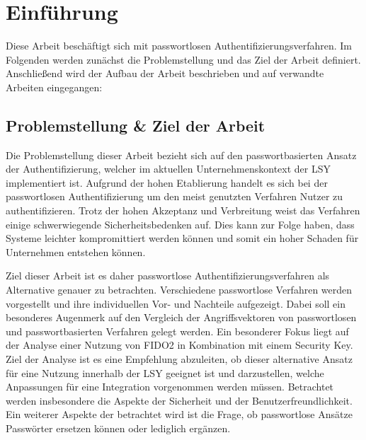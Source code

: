 \chapter{Einführung}
Diese Arbeit beschäftigt sich mit passwortlosen Authentifizierungsverfahren. Im Folgenden werden zunächst die Problemstellung und das Ziel der Arbeit definiert. Anschließend wird der Aufbau der Arbeit beschrieben und auf verwandte Arbeiten eingegangen:

\section{Problemstellung \& Ziel der Arbeit} \label{target}
Die Problemstellung dieser Arbeit bezieht sich auf den passwortbasierten Ansatz der Authentifizierung, welcher im aktuellen Unternehmenskontext der \ac{LSY} implementiert ist. Aufgrund der hohen Etablierung handelt es sich bei der passwortlosen Authentifizierung um den meist genutzten Verfahren Nutzer zu authentifizieren. Trotz der hohen Akzeptanz und Verbreitung weist das Verfahren einige schwerwiegende Sicherheitsbedenken auf. Dies kann zur Folge haben, dass Systeme leichter kompromittiert werden können und somit ein hoher Schaden für Unternehmen entstehen können.

Ziel dieser Arbeit ist es daher passwortlose Authentifizierungsverfahren als Alternative genauer zu betrachten. Verschiedene passwortlose Verfahren werden vorgestellt und ihre individuellen Vor- und Nachteile aufgezeigt. Dabei soll ein besonderes Augenmerk auf den Vergleich der Angriffsvektoren von passwortlosen und passwortbasierten Verfahren gelegt werden. Ein besonderer Fokus liegt auf der Analyse einer Nutzung von \ac{FIDO}2 in Kombination mit einem Security Key. Ziel der Analyse ist es eine Empfehlung abzuleiten, ob dieser alternative Ansatz für eine Nutzung innerhalb der \ac{LSY} geeignet ist und darzustellen, welche Anpassungen für eine Integration vorgenommen werden müssen. Betrachtet werden insbesondere die Aspekte der Sicherheit und der Benutzerfreundlichkeit. Ein weiterer Aspekte der betrachtet wird ist die Frage, ob passwortlose Ansätze Passwörter ersetzen können oder lediglich ergänzen. 

